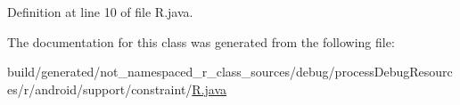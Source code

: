 Definition at line 10 of file R.\+java.


\begin{DoxyCode}{0}

\end{DoxyCode}


The documentation for this class was generated from the following file\+:\begin{DoxyCompactItemize}
\item 
build/generated/not\+\_\+namespaced\+\_\+r\+\_\+class\+\_\+sources/debug/process\+Debug\+Resources/r/android/support/constraint/\mbox{\hyperlink{android_2support_2constraint_2_r_8java}{R.\+java}}\end{DoxyCompactItemize}
